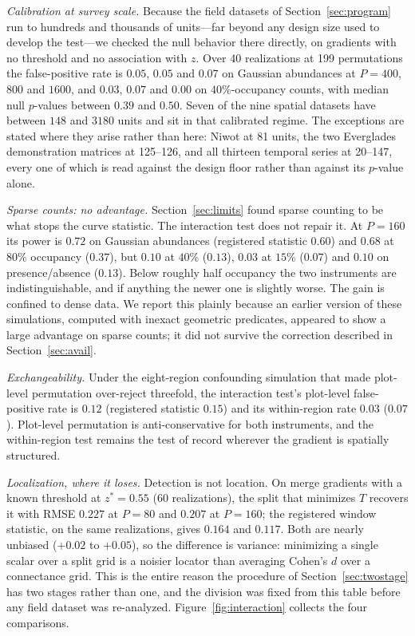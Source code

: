 \documentclass[review,12pt,authoryear]{elsarticle}
\theoremstyle{remark}
\begin{document}
\emph{Calibration at survey scale.} Because the field datasets of
Section~\ref{sec:program} run to hundreds and thousands of units---far
beyond any design size used to develop the test---we checked the null
behavior there directly, on gradients with no threshold and no association
with $z$. Over 40 realizations at 199 permutations the false-positive rate
is $0.05$, $0.05$ and $0.07$ on Gaussian abundances at $P = 400$, $800$ and
$1600$, and $0.03$, $0.07$ and $0.00$ on $40\%$-occupancy counts, with
median null $p$-values between $0.39$ and $0.50$. Seven of the nine spatial
datasets have between $148$ and $3180$ units and sit in that calibrated
regime. The exceptions are stated where they arise rather than here: Niwot
at 81 units, the two Everglades demonstration matrices at 125--126, and all
thirteen temporal series at 20--147, every one of which is read against the
design floor rather than against its $p$-value alone.

\emph{Sparse counts: no advantage.} Section~\ref{sec:limits} found sparse
counting to be what stops the curve statistic. The interaction test does not
repair it. At $P = 160$ its power is $0.72$ on Gaussian abundances
(registered statistic $0.60$) and $0.68$ at $80\%$ occupancy ($0.37$), but
$0.10$ at $40\%$ ($0.13$), $0.03$ at $15\%$ ($0.07$) and $0.10$ on
presence/absence ($0.13$). Below roughly half occupancy the two instruments
are indistinguishable, and if anything the newer one is slightly worse. The
gain is confined to dense data. We report this plainly because an earlier
version of these simulations, computed with inexact geometric predicates,
appeared to show a large advantage on sparse counts; it did not survive the
correction described in Section~\ref{sec:avail}.

\emph{Exchangeability.} Under the eight-region confounding simulation that
made plot-level permutation over-reject threefold, the interaction test's
plot-level false-positive rate is $0.12$ (registered statistic $0.15$) and
its within-region rate $0.03$ ($0.07$). Plot-level permutation is
anti-conservative for both instruments, and the within-region test remains
the test of record wherever the gradient is spatially structured.

\emph{Localization, where it loses.} Detection is not location. On merge
gradients with a known threshold at $z^\ast = 0.55$ (60 realizations), the
split that minimizes $T$ recovers it with RMSE $0.227$ at $P = 80$ and
$0.207$ at $P = 160$; the registered window statistic, on the same
realizations, gives $0.164$ and $0.117$. Both are nearly unbiased
($+0.02$ to $+0.05$), so the difference is variance: minimizing a single
scalar over a split grid is a noisier locator than averaging Cohen's $d$
over a connectance grid. This is the entire reason the procedure of
Section~\ref{sec:twostage} has two stages rather than one, and the division
was fixed from this table before any field dataset was re-analyzed.
Figure~\ref{fig:interaction} collects the four comparisons.
\end{document}
